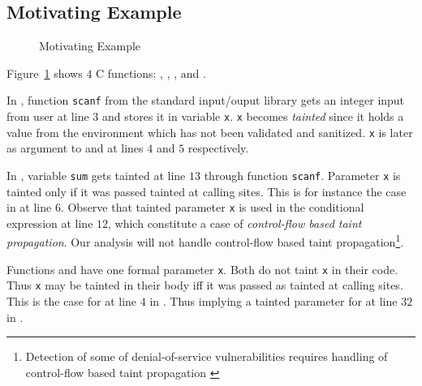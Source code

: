 \subsection{Motivating Example}\label{example} 

\begin{figure}[!h]
\begin{center}
\end{center}
\caption{Motivating Example}
\label{fig:sample}
\end{figure}

Figure~\ref{fig:sample} shows $4$ C functions:
\main, \even, \odd, and \compute.

In \main{}, function \texttt{scanf} from the standard input/ouput
library gets an integer input from user at line $3$
and stores it in variable \texttt{x}. \texttt{x} 
becomes \textit{tainted} since it holds a value from
the environment which has not been validated and
sanitized.
\texttt{x} is later as argument to \even{} and \odd{} at
lines $4$ and $5$ respectively.

In \compute{}, variable \texttt{sum} gets tainted at
line $13$ through function \texttt{scanf}. Parameter
\texttt{x} is tainted only if it was passed tainted
at calling sites.
This is for instance the case in \main{} at line $6$.
Observe that tainted parameter \texttt{x} is used in
the conditional expression at line $12$, which constitute
a case of \textit{control-flow based taint propagation}.
Our analysis will not handle control-flow based taint
propagation\footnote{Detection of some of denial-of-service
vulnerabilities requires handling of control-flow based
taint propagation \cite{Chang:2009:ICS}}. 

Functions \even{} and \odd{} have one formal parameter
\texttt{x}. Both do not taint \texttt{x} in their code.
Thus \texttt{x} may be tainted in their body iff it was
passed as tainted at calling sites. This is the case
for \even{} at line $4$ in \main{}. Thus implying a tainted
parameter for \odd{} at line $32$ in \even{}.